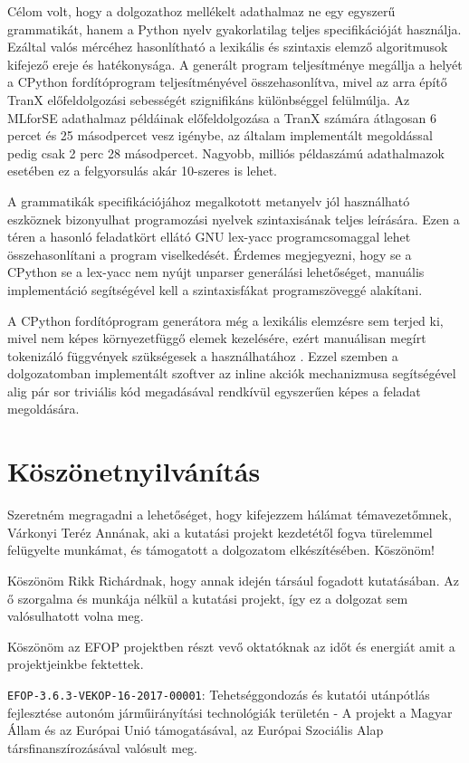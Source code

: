 \documentclass[twoside, 12pt]{report}
\begin{document}
Célom volt, hogy a dolgozathoz mellékelt adathalmaz ne egy egyszerű grammatikát, hanem a Python nyelv gyakorlatilag teljes specifikációját használja. Ezáltal valós mércéhez hasonlítható a lexikális és szintaxis elemző algoritmusok kifejező ereje és hatékonysága. A generált program teljesítménye megállja a helyét a CPython fordítóprogram teljesítményével összehasonlítva, mivel az arra építő TranX előfeldolgozási sebességét szignifikáns különbséggel felülmúlja. Az MLforSE adathalmaz példáinak előfeldolgozása a TranX számára átlagosan 6 percet és 25 másodpercet vesz igénybe, az általam implementált megoldással pedig csak 2 perc 28 másodpercet. Nagyobb, milliós példaszámú adathalmazok esetében ez a felgyorsulás akár 10-szeres is lehet.

A grammatikák specifikációjához megalkotott metanyelv jól használható eszköznek bizonyulhat programozási nyelvek szintaxisának teljes leírására. Ezen a téren a hasonló feladatkört ellátó GNU lex-yacc programcsomaggal lehet összehasonlítani a program viselkedését. Érdemes megjegyezni, hogy se a CPython se a lex-yacc nem nyújt unparser generálási lehetőséget, manuális implementáció segítségével kell a szintaxisfákat programszöveggé alakítani.

A CPython fordítóprogram generátora még a lexikális elemzésre sem terjed ki, mivel nem képes környezetfüggő elemek kezelésére, ezért manuálisan megírt tokenizáló függvények szükségesek a használhatához \parencite{PSF20a}. Ezzel szemben a dolgozatomban implementált szoftver az inline akciók mechanizmusa segítségével alig pár sor triviális kód megadásával rendkívül egyszerűen képes a feladat megoldására.

\chapter{Köszönetnyilvánítás}

Szeretném megragadni a lehetőséget, hogy kifejezzem hálámat témavezetőmnek, Várkonyi Teréz Annának, aki a kutatási projekt kezdetétől fogva türelemmel felügyelte munkámat, és támogatott a dolgozatom elkészítésében. Köszönöm!

Köszönöm Rikk Richárdnak, hogy annak idején társául fogadott kutatásában. Az ő szorgalma és  munkája nélkül a kutatási projekt, így ez a dolgozat sem valósulhatott volna meg.

Köszönöm az EFOP projektben részt vevő oktatóknak az időt és energiát amit a projektjeinkbe fektettek.

\verb|EFOP-3.6.3-VEKOP-16-2017-00001|: Tehetséggondozás és kutatói utánpótlás fejlesztése autonóm járműirányítási technológiák területén - A projekt a Magyar Állam és az Európai Unió támogatásával, az Európai Szociális Alap társfinanszírozásával valósult meg.

\newpage
\let\origaddvspace\addvspace
\renewcommand{\addvspace}[1]{}
\thispagestyle{empty}
\begingroup
\let\clearpage\relax
\listoffigures
\listoftables
\endgroup
\renewcommand{\addvspace}[1]{\origaddvspace{#1}}

\newpage
{}
\printbibliography
\end{document}
